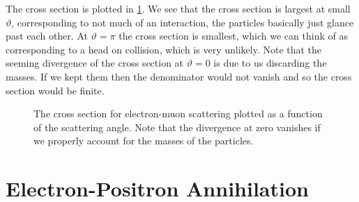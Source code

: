 \documentclass[fleqn]{NotesClass}
\begin{document}
    The cross section is plotted in \cref{fig:electron muon scattering cross section}.
    We see that the cross section is largest at small \(\vartheta\), corresponding to not much of an interaction, the particles basically just glance past each other.
    At \(\vartheta = \pi\) the cross section is smallest, which we can think of as corresponding to a head on collision, which is very unlikely.
    Note that the seeming divergence of the cross section at \(\vartheta = 0\) is due to us discarding the masses.
    If we kept them then the denominator would not vanish and so the cross section would be finite.
    
    \begin{figure}
        \caption[Electron-muon scattering cross section]{The cross section for electron-muon scattering plotted as a function of the scattering angle. Note that the divergence at zero vanishes if we properly account for the masses of the particles.}
        \label{fig:electron muon scattering cross section}
    \end{figure}
    
    \chapter{Electron-Positron Annihilation}
\end{document}
